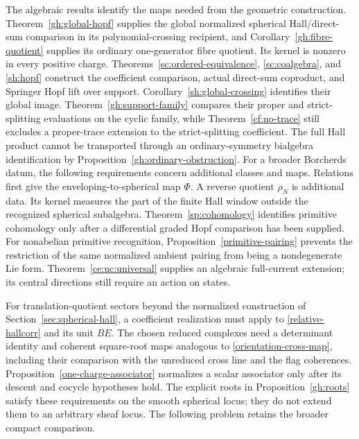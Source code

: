 \documentclass[11pt]{article}
\begin{document}
The algebraic results identify the maps needed from the geometric
construction.
Theorem~\ref{gh:global-hopf} supplies the global normalized spherical
Hall/direct-sum comparison in its polynomial-crossing recipient, and
Corollary~\ref{gh:fibre-quotient} supplies its ordinary one-generator
fibre quotient. Its kernel is nonzero in every positive charge.
Theorems~\ref{sc:ordered-equivalence}, \ref{sc:coalgebra}, and
\ref{sh:hopf} construct the coefficient comparison, actual
direct-sum coproduct, and Springer Hopf lift over support.
Corollary~\ref{sh:global-crossing} identifies their global image.
Theorem~\ref{gh:support-family} compares their proper and
strict-splitting evaluations on the cyclic family, while
Theorem~\ref{cf:no-trace} still excludes a proper-trace extension
to the strict-splitting coefficient.
The full Hall product cannot be transported through an
ordinary-symmetry bialgebra identification by
Proposition~\ref{gh:ordinary-obstruction}.
For a broader Borcherds datum, the following requirements concern
additional classes and maps.
Relations first give the enveloping-to-spherical map $\Phi$.
A reverse quotient $\rho_N$ is additional data.
Its kernel measures the part of the finite Hall window outside the
recognized spherical subalgebra.
Theorem~\ref{sp:cohomology} identifies primitive cohomology only after
a differential graded Hopf comparison has been supplied.
For nonabelian primitive recognition,
Proposition~\ref{primitive-pairing} prevents the restriction of the same
normalized ambient pairing from being a nondegenerate Lie form.
Theorem~\ref{ce:uc:universal} supplies an algebraic full-current extension;
its central directions still require an action on states.

For translation-quotient sectors beyond the normalized construction of
Section~\ref{sec:spherical-hall}, a coefficient realization must apply
to \eqref{relative-hallcorr} and its unit $BE$.
The chosen reduced complexes need a determinant identity and coherent
square-root maps analogous to \eqref{orientation-cross-map}, including
their comparison with the unreduced cross line and the flag coherences.
Proposition~\ref{one-charge-associator} normalizes a scalar associator
only after its descent and cocycle hypotheses hold.
The explicit roots in Proposition~\ref{gh:roots} satisfy these
requirements on the smooth spherical locus; they do not extend them
to an arbitrary sheaf locus.
The following problem retains the broader compact comparison.
\end{document}
